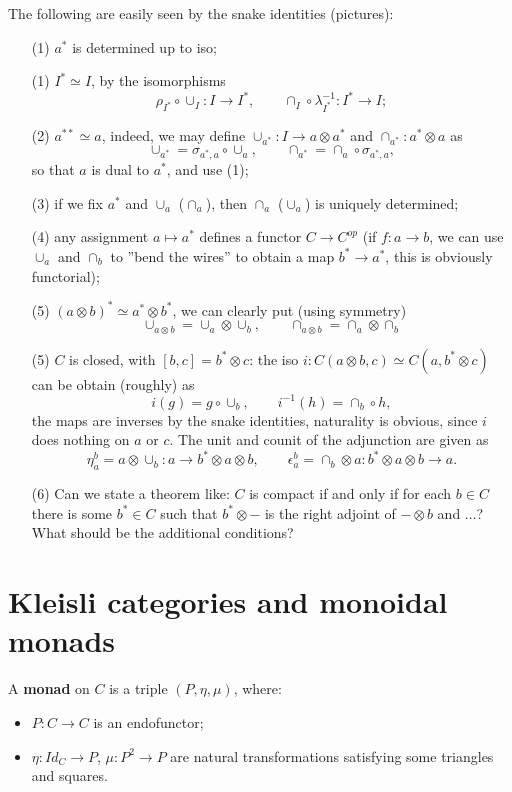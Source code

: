 \documentclass[12pt]{article}
\theoremstyle{definition}
\theoremstyle{remark}
\begin{document}
The following are easily seen by the snake identities (pictures):
\begin{itemize}
\item[(1)] $a^*$ is determined up to iso;
\item[(1)] $I^*\simeq I$, by the isomorphisms 
\[
\rho_{I^*}\circ \cup_I: I\to I^*,\qquad \cap_I\circ \lambda^{-1}_{I^*}: I^*\to I;
\]
\item[(2)] $a^{**}\simeq a$, indeed, we may define $\cup_{a^*}: I\to a\otimes a^*$ and
$\cap_{a^*}: a^*\otimes a$ as
\[
\cup_{a^*}=\sigma_{a^*,a}\circ \cup_a,\qquad \cap_{a^*}=\cap_a\circ \sigma_{a^*,a},
\]
so that $a$ is dual to $a^*$, and use (1);
\item[(3)] if we fix $a^*$ and $\cup_a$ ($\cap_a$), then  $\cap_a$ ($\cup_a$) is uniquely
determined;
\item[(4)] any assignment $a\mapsto a^*$ defines a functor $C\to C^{op}$ (if $f:a\to b$,
we can use $\cup_a$ and $\cap_b$ to ''bend the wires'' to obtain a map $b^*\to a^*$, this
is obviously functorial);
\item[(5)] $(a\otimes b)^*\simeq a^*\otimes b^*$, we can clearly put (using symmetry)
\[
\cup_{a\otimes b}=\cup_a\otimes \cup_b,\qquad \cap_{a\otimes b}=\cap_a\otimes \cap_b
\]
\item[(5)] $C$ is closed, with $[b,c]=b^*\otimes c$: the iso $i: C(a\otimes b,c)\simeq
C(a,b^*\otimes c)$ can be obtain (roughly) as
\[
i(g)=g\circ \cup_b,\qquad i^{-1}(h)=\cap_b\circ h,
\]
the maps are inverses by the snake identities, naturality is obvious, since $i$ does
nothing on $a$ or $c$. The unit and counit of the adjunction are given as
\[
\eta^b_a=a\otimes \cup_b : a\to b^*\otimes a\otimes b,\qquad \epsilon^b_a=\cap_b\otimes a:
b^*\otimes a\otimes b\to a.
\]
\item[(6)] Can we state a theorem like:  $C$ is compact if and only if for each $b\in C$
there is some $b^*\in C$ such that $b^*\otimes -$ is the right adjoint of $-\otimes b$ and
...? What should be the additional conditions?

\end{itemize}


\section{Kleisli categories and monoidal monads} 

A \textbf{monad} on $C$ is a triple $(P,\eta,\mu)$, where:
\begin{itemize}
\item $P: C\to C$ is an endofunctor;

\item $\eta: Id_C\to P$, $\mu: P^2\to P$ are natural transformations satisfying some
triangles and squares.
\end{itemize}
\end{document}
